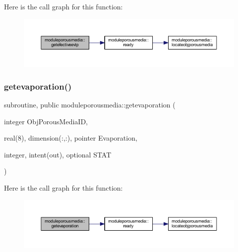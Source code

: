 Here is the call graph for this function\+:\nopagebreak
\begin{figure}[H]
\begin{center}
\leavevmode
\includegraphics[width=350pt]{namespacemoduleporousmedia_a2706d0d1284873eb1538b17e9b347d9a_cgraph}
\end{center}
\end{figure}
\mbox{\label{namespacemoduleporousmedia_a03d64458de86e4672fab26f2e74233b8}} 
\subsubsection{\texorpdfstring{getevaporation()}{getevaporation()}}
{\footnotesize\ttfamily subroutine, public moduleporousmedia\+::getevaporation (\begin{DoxyParamCaption}\item[{integer}]{Obj\+Porous\+Media\+ID,  }\item[{real(8), dimension(\+:,\+:), pointer}]{Evaporation,  }\item[{integer, intent(out), optional}]{S\+T\+AT }\end{DoxyParamCaption})}

Here is the call graph for this function\+:\nopagebreak
\begin{figure}[H]
\begin{center}
\leavevmode
\includegraphics[width=350pt]{namespacemoduleporousmedia_a03d64458de86e4672fab26f2e74233b8_cgraph}
\end{center}
\end{figure}
\mbox{\label{namespacemoduleporousmedia_ac5c8b09a721ba8f3b2b3610d90098651}} 
